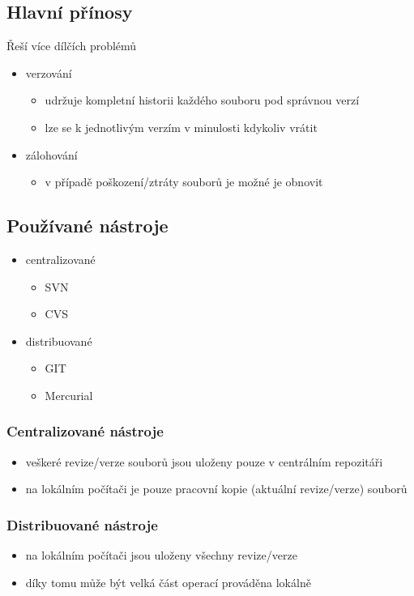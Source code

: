 \documentclass{szzclass}
\begin{document}
\subsection{Hlavní přínosy}
Řeší více dílčích problémů
\begin{itemize}
    \item verzování
    \begin{itemize}
        \item udržuje kompletní historii každého souboru pod správnou verzí
        \item lze se k jednotlivým verzím v minulosti kdykoliv vrátit
    \end{itemize}
    \item zálohování
    \begin{itemize}
        \item v případě poškození/ztráty souborů je možné je obnovit
    \end{itemize}
\end{itemize}
\subsection{Používané nástroje}
\begin{itemize}
    \item centralizované
    \begin{itemize}
        \item SVN
        \item CVS
    \end{itemize}
    \item distribuované
    \begin{itemize}
        \item GIT
        \item Mercurial
    \end{itemize}
\end{itemize}
\subsubsection{Centralizované nástroje}
\begin{itemize}
    \item veškeré revize/verze souborů jsou uloženy pouze v centrálním repozitáři
    \item na lokálním počítači je pouze pracovní kopie (aktuální revize/verze) souborů
\end{itemize}
\subsubsection{Distribuované nástroje}
\begin{itemize}
    \item na lokálním počítači jsou uloženy všechny revize/verze
    \item díky tomu může být velká část operací prováděna lokálně
\end{itemize}
\end{document}
